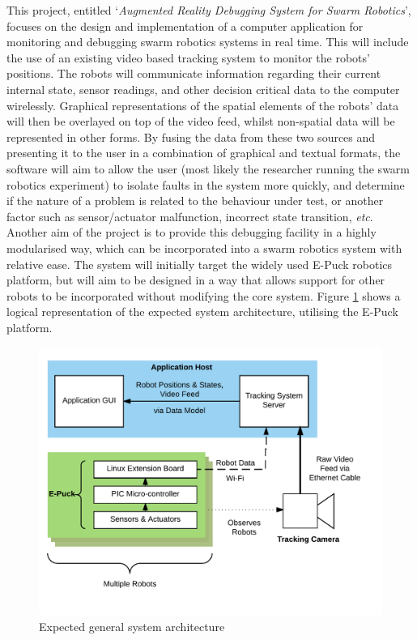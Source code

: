 \documentclass[titlepage,hidelinks,10pt]{article}
\begin{document}
This project, entitled `\textit{Augmented Reality Debugging System for Swarm Robotics}', focuses on the design and implementation of a computer application for monitoring and debugging swarm robotics systems in real time. This will include the use of an existing video based tracking system to monitor the robots' positions. The robots will communicate information regarding their current internal state, sensor readings, and other decision critical data to the computer wirelessly. Graphical representations of the spatial elements of the robots' data will then be overlayed on top of the video feed, whilst non-spatial data will be represented in other forms. By fusing the data from these two sources and presenting it to the user in a combination of graphical and textual formats, the software will aim to allow the user (most likely the researcher running the swarm robotics experiment) to isolate faults in the system more quickly, and determine if the nature of a problem is related to the behaviour under test, or another factor such as sensor/actuator malfunction, incorrect state transition, \textit{etc}. Another aim of the project is to provide this debugging facility in a highly modularised way, which can be incorporated into a swarm robotics system with relative ease. The system will initially target the widely used E-Puck\cite{EPuck} robotics platform, but will aim to be designed in a way that allows support for other robots to be incorporated without modifying the core system. Figure \ref{fig:SystemArchitecture} shows a logical representation of the expected system architecture, utilising the E-Puck platform. 

\begin{figure}[H]
	\begin{center}
	\includegraphics[scale=0.9]{SystemArchitecture.png}
	\caption{Expected general system architecture}
	\label{fig:SystemArchitecture}
	\end{center}
\end{figure}
\end{document}
